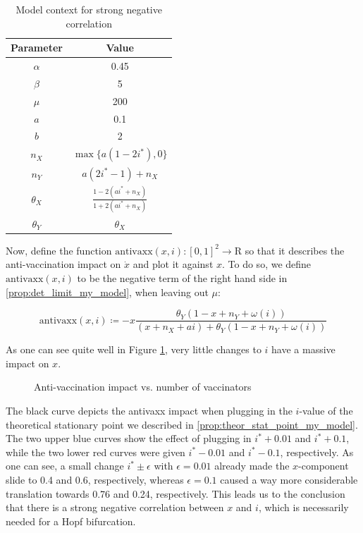 \documentclass[12pt,a4paper,twoside]{article}
\begin{document}
\begin{table}[h!]\label{table:alu_vs_x_params}
	\centering
	\caption{Model context for strong negative correlation}
	\begin{tabular}{c|c}
		Parameter & Value \\
		\hline
		$\alpha$&0.45\\
		$\beta$&5\\
		$\mu$&200\\
		$a$&0.1\\
		$b$&2\\
		$n_X$&$\max \lbrace a\left(1-2i^*\right), 0\rbrace$\\
		$n_Y$&$a\left(2i^* - 1\right) + n_X$\\
		$\theta_X$&$\frac{1-2\left(ai^* + n_X\right)}{1+2\left(ai^* + n_X\right)}$\\
		$\theta_Y$& $\theta_X$\\
	\end{tabular}
\end{table}

Now, define the function $\mathrm{antivaxx}\left(x,i\right): \left[0,1\right]^2 \rightarrow \mathrm{R}$ so that it describes the anti-vaccination impact on $\dot{x}$ and plot it against $x$. To do so, we define $\mathrm{antivaxx}\left(x,i\right)$ to be the negative term of the right hand side in \eqref{prop:det_limit_my_model}, when leaving out $\mu$:

\begin{equation*}
\mathrm{antivaxx}\left(x,i\right) \coloneqq -x\frac{\theta_Y(1-x+n_Y+\omega\left(i\right))}{(x+n_X+ai) + \theta_Y(1-x+n_Y+\omega\left(i\right))}
\end{equation*}

 As one can see quite well in Figure \ref{fig:alu_vs_x}, very little changes to $i$ have a massive impact on $x$.

\begin{figure}[h!]
	\centering
	\def\svgwidth{350pt}
	
	\caption{Anti-vaccination impact vs. number of vaccinators}
	\label{fig:alu_vs_x}
\end{figure}

The black curve depicts the antivaxx impact when plugging in the $i$-value of the theoretical stationary point we described in \eqref{prop:theor_stat_point_my_model}. The two upper blue curves show the effect of plugging in $i^* + 0.01$ and $i^* + 0.1$, while the two lower red curves were given $i^* - 0.01$ and $i^* - 0.1$, respectively. As one can see, a small change $i^* \pm \epsilon$ with $\epsilon = 0.01$ already made the $x$-component slide to 0.4 and 0.6, respectively, whereas $\epsilon = 0.1$ caused a way more considerable translation towards
0.76 and 0.24, respectively. This leads us to the conclusion that there is a strong negative correlation between $x$ and $i$, which is necessarily needed for a Hopf bifurcation.
\end{document}
